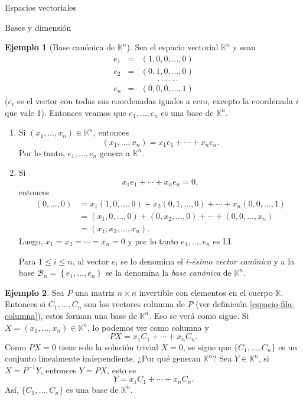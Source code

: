 \documentclass[a4paper,12pt,twoside,spanish,reqno]{amsbook}
\theoremstyle{definition}
\newtheorem{ejemplo}{Ejemplo}[section]
\theoremstyle{remark}
\newcommand{\K}{\mathbb K}
\begin{document}
\begin{chapter}{Espacios vectoriales}
\begin{section}{Bases y dimensión}
\begin{ejemplo}[{\sc Base canónica de $\K^n$}] Sea el espacio vectorial $\K^n$ y sean
	\begin{equation*}
	\begin{array}{rcl}
	e_1 &=& (1,0,0,\ldots,0) \\
	e_2 &=& (0,1,0,\ldots,0) \\
	&&\qquad.\,.\,.\,.\,.\,.\,\\ 
	e_n&=& (0,0,0,\ldots,1)
	\end{array}
	\end{equation*}
	($e_i$ es el vector con todas sus coordenadas iguales a cero,  excepto  la coordenada $i$ que vale 1). Entonces veamos que  $e_1,\ldots,e_n$ es una base de $\K^n$.
	\begin{enumerate}
		\item Si $(x_1,\ldots,x_n) \in \K^n$,  entonces
		$$
		(x_1,\ldots,x_n) = x_1e_1+\cdots+x_ne_n.
		$$
		Por lo tanto, $e_1,\ldots,e_n$ genera a  $\K^n$.
		\item Si 
		$$
		x_1e_1+\cdots+x_ne_n =0,
		$$
		entonces
		\begin{align*}
			(0,\ldots,0) &= x_1(1,0,\ldots,0)+ x_2(0,1,\ldots,0)+\cdots+x_n(0,0,\ldots,1)\\ 
			&=  (x_1,0,\ldots,0)+(0,x_2,\ldots,0)+\cdots+(0,0,\ldots,x_n)\\ &= (x_1,x_2,\ldots,x_n).
		\end{align*}
		Luego, $x_1= x_2=\cdots=x_n =0$ y por lo tanto $e_1,\ldots,e_n$ es LI.
		
		Para $1 \le i \le n$, al vector $e_i$ se lo denomina el \textit{$i$-ésimo vector canónico}  y a la base $\mathcal B_n = \left\{e_1,\ldots,e_n \right\}$ se la denomina la \textit{base canónica} de $\K^n$. 
		
		
	\end{enumerate}
\end{ejemplo}
 
 
 \begin{ejemplo}
 	Sea $P$ una matriz $n \times n$ invertible con elementos en el cuerpo $\K$. Entonces si $C_1,\ldots,C_n$ son los vectores columna de $P$ (ver definición  \ref{espacio-fila-columna}), estos forman una base de $\K^n$. Eso se verá como sigue. Si $X = (x_1,\ldots,x_n) \in \K^n$, lo podemos ver como columna y 
 	$$
 	PX=x_1C_1+\cdots+x_nC_n.
 	$$
 	Como $PX=0$ tiene solo la solución trivial $X= 0$, se sigue que $\{C_1,\ldots,C_n\}$ es un conjunto linealmente independiente. ¿Por qué generan $\K^n$? Sea $Y \in \K^n$, si $X = P^{-1} Y$, entonces $Y = PX$, esto es
 	$$
 	Y=x_1C_1+\cdots+x_nC_n.
 	$$
 	Así, $\{C_1,\ldots,C_n\}$ es una base de $\K^n$.
 \end{ejemplo}



\end{section}
\end{chapter}
\end{document}
